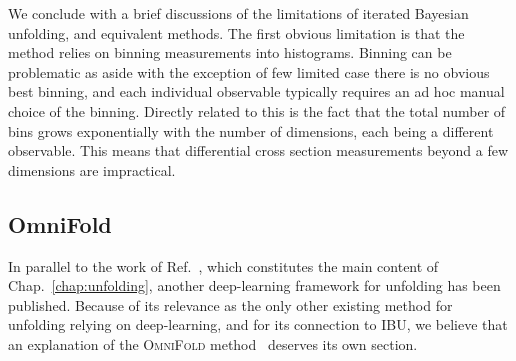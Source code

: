 We conclude with a brief discussions of the limitations of iterated Bayesian unfolding, and equivalent methods. The first obvious limitation is that the method relies on binning measurements into histograms. Binning can be problematic as aside with the exception of few limited case there is no obvious best binning, and each individual observable typically requires an ad hoc manual choice of the binning. Directly related to this is the fact that the total number of bins grows exponentially with the number of dimensions, each being a different observable. This means that differential cross section measurements beyond a few dimensions are impractical.

\subsection{OmniFold}

In parallel to the work of Ref.~\cite{cond_gan, Bellagente:2020piv}, which constitutes the main content of Chap.~\ref{chap:unfolding}, another deep-learning framework for unfolding has been published. Because of its relevance as the only other existing method for unfolding relying on deep-learning, and for its connection to IBU, we believe that an explanation of the \textsc{OmniFold} method~\cite{Andreassen:2019cjw} deserves its own section.

